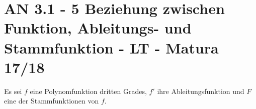 \section{AN 3.1 - 5 Beziehung zwischen Funktion, Ableitungs- und Stammfunktion - LT - Matura 17/18}

\begin{beispiel}[AN 3.1]{1} %
Es sei $f$ eine Polynomfunktion dritten Grades, $f'$ ihre Ableitungsfunktion und $F$ eine der Stammfunktionen von $f$.

\end{beispiel}